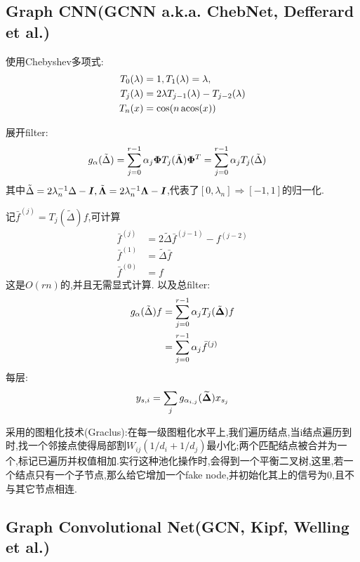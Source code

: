 \documentclass{article}
\begin{document}
\subsection{Graph CNN(GCNN a.k.a. ChebNet, Defferard et al.)}

使用Chebyshev多项式:
\begin{align}
    T_0(\lambda)&=1,
    T_1(\lambda)=\lambda,\\
    T_j(\lambda)&=2\lambda T_{j-1}(\lambda)-T_{j-2}(\lambda)\\
    T_n(x)&=\cos(n \acos(x))
\end{align}

展开filter:
\begin{align}
    g_\alpha(\tilde \Delta)
    &=\sum_{j=0}^{r-1}\alpha_j \boldsymbol{\Phi}T_j(\tilde{\boldsymbol{\Lambda}})\boldsymbol{\Phi}^T
    =\sum_{j=0}^{r-1}\alpha_j T_j(\tilde{\Delta})
\end{align}
其中$\tilde{\Delta}=2\lambda_n^{-1} \Delta-\boldsymbol{I},\tilde{\boldsymbol{\Lambda}}=2\lambda_n^{-1} \boldsymbol{\Lambda}-\boldsymbol{I}$,代表了$[0,\lambda_n]\Rightarrow[-1,1]$的归一化.

记$\bar f^{(j)}=T_j(\tilde{\Delta})f$,可计算
\begin{align}
    \bar f^{(j)}&=2\tilde \Delta \bar f^{(j-1)}-f^{(j-2)}\\
    \bar f^{(1)}&=\tilde \Delta \bar f\\
    \bar f^{(0)}&=f
\end{align}
这是$O(rn)$的,并且无需显式计算\lop .
以及总filter:
\begin{align}
    g_\alpha(\tilde \Delta) f
    &=\sum_{j=0}^{r-1}\alpha_j T_j(\tilde{\boldsymbol{\Delta}}) f\\
    &=\sum_{j=0}^{r-1}\alpha_j \bar f^{(j)}
\end{align}
每层:
\begin{align}
    y_{s,i}=\sum_{j} g_{\alpha_{i,j}}(\widetilde{\boldsymbol{\Delta}})x_{s_j}
\end{align}

采用的图粗化技术(Graclus):在每一级图粗化水平上,我们遍历结点,当i结点遍历到时,找一个邻接点使得局部割$W_{ij}(1/d_i+1/d_j)$最小化;两个匹配结点被合并为一个,标记已遍历并权值相加.实行这种池化操作时,会得到一个平衡二叉树,这里,若一个结点只有一个子节点,那么给它增加一个fake node,并初始化其上的信号为0,且不与其它节点相连.


\subsection{Graph Convolutional Net(GCN, Kipf, Welling et al.)}
\end{document}
